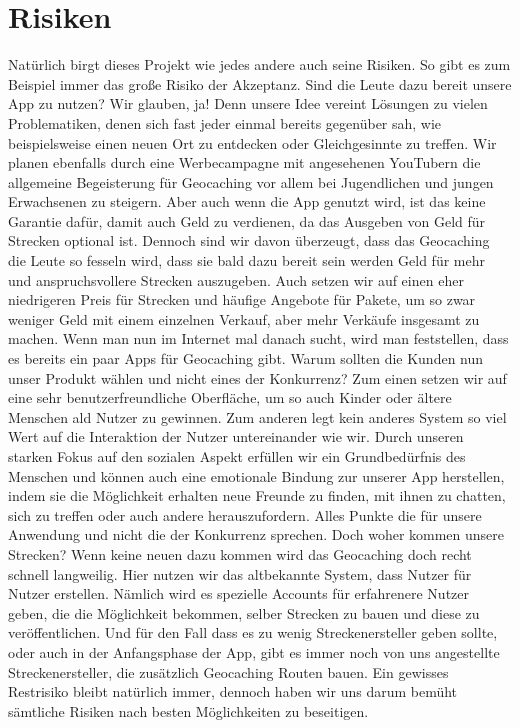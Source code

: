 \documentclass[a4paper, 12pp]{article}
\begin{document}
\section{Risiken}
Natürlich birgt dieses Projekt wie jedes andere auch seine Risiken.\newline
So gibt es zum Beispiel immer das große Risiko der Akzeptanz. Sind die Leute dazu bereit unsere App zu nutzen? Wir glauben, ja! Denn unsere Idee vereint Lösungen zu vielen Problematiken, denen sich fast jeder einmal bereits gegenüber sah, wie beispielsweise einen neuen Ort zu entdecken oder Gleichgesinnte zu treffen. Wir planen ebenfalls durch eine Werbecampagne mit angesehenen YouTubern die allgemeine Begeisterung für Geocaching vor allem bei Jugendlichen und jungen Erwachsenen zu steigern.\newline
Aber auch wenn die App genutzt wird, ist das keine Garantie dafür, damit auch Geld zu verdienen, da das Ausgeben von Geld für Strecken optional ist. Dennoch sind wir davon überzeugt, dass das Geocaching die Leute so fesseln wird, dass sie bald dazu bereit sein werden Geld für mehr und anspruchsvollere Strecken auszugeben. Auch setzen wir auf einen eher niedrigeren Preis für Strecken und häufige Angebote für Pakete, um so zwar weniger Geld mit einem einzelnen Verkauf, aber mehr Verkäufe insgesamt zu machen.\newline
Wenn man nun im Internet mal danach sucht, wird man feststellen, dass es bereits ein paar Apps für Geocaching gibt. Warum sollten die Kunden nun unser Produkt wählen und nicht eines der Konkurrenz? Zum einen setzen wir auf eine sehr benutzerfreundliche Oberfläche, um so auch Kinder oder ältere Menschen ald Nutzer zu gewinnen. Zum anderen legt kein anderes System so viel Wert auf die Interaktion der Nutzer untereinander wie wir. Durch unseren starken Fokus auf den sozialen Aspekt erfüllen wir ein Grundbedürfnis des Menschen und können auch eine emotionale Bindung zur unserer App herstellen, indem sie die Möglichkeit erhalten neue Freunde zu finden, mit ihnen zu chatten, sich zu treffen oder auch andere herauszufordern. Alles Punkte die für unsere Anwendung und nicht die der Konkurrenz sprechen.\newline
Doch woher kommen unsere Strecken? Wenn keine neuen dazu kommen wird das Geocaching doch recht schnell langweilig. Hier nutzen wir das altbekannte System, dass Nutzer für Nutzer erstellen. Nämlich wird es spezielle Accounts für erfahrenere Nutzer geben, die die Möglichkeit bekommen, selber Strecken zu bauen und diese zu veröffentlichen. Und für den Fall dass es zu wenig Streckenersteller geben sollte, oder auch in der Anfangsphase der App, gibt es immer noch von uns angestellte Streckenersteller, die zusätzlich Geocaching Routen bauen.\newline
Ein gewisses Restrisiko bleibt natürlich immer, dennoch haben wir uns darum bemüht sämtliche Risiken nach besten Möglichkeiten zu beseitigen.
\end{document}
